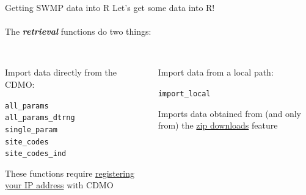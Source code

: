 \documentclass[xcolor=dvipsnames]{beamer}\usepackage[]{graphicx}\usepackage[]{color}
\makeatletter
\newcommand{\hlstd}[1]{\textcolor[rgb]{0.345,0.345,0.345}{#1}}%
\newenvironment{kframe}{%
 \def\at@end@of@kframe{}%
 \ifinner\ifhmode%
  \def\at@end@of@kframe{\end{minipage}}%
  \begin{minipage}{\columnwidth}%
 \fi\fi%
 \def\FrameCommand##1{\hskip\@totalleftmargin \hskip-\fboxsep
 \colorbox{shadecolor}{##1}\hskip-\fboxsep
     \hskip-\linewidth \hskip-\@totalleftmargin \hskip\columnwidth}%
 \MakeFramed {\advance\hsize-\width
   \@totalleftmargin\z@ \linewidth\hsize
   \@setminipage}}%
 {\par\unskip\endMakeFramed%
 \at@end@of@kframe}
\newenvironment{knitrout}{}{} %
\newcommand{\Bigtxt}[1]{\textbf{\textit{#1}}}
\makeatother
\begin{document}
\begin{frame}[fragile]{Getting SWMP data into R}
Let's get some data into R!\\~\\
The \Bigtxt{retrieval} functions do two things: \\~\\
\begin{columns}[t]
\begin{column}{0.4\textwidth}
Import data directly from the CDMO:
\begin{knitrout}\scriptsize
{}\color{fgcolor}\begin{kframe}
\begin{alltt}
\hlstd{all_params}
\hlstd{all_params_dtrng}
\hlstd{single_param}
\hlstd{site_codes}
\hlstd{site_codes_ind}
\end{alltt}
\end{kframe}
\end{knitrout}
These functions require \href{http://cdmo.baruch.sc.edu/webservices.cfm}{registering your IP address}  with CDMO
\end{column}
\begin{column}{0.4\textwidth}
Import data from a local path:
\begin{knitrout}\scriptsize
{}\color{fgcolor}\begin{kframe}
\begin{alltt}
\hlstd{import_local}
\end{alltt}
\end{kframe}
\end{knitrout}
Imports data obtained from (and only from) the \href{http://cdmo.baruch.sc.edu/aqs/zips.cfm}{zip downloads} feature
\end{column}
\end{columns}
\end{frame}
\end{document}
